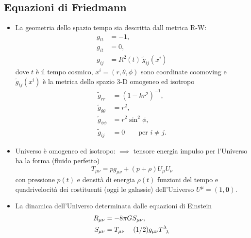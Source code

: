 \chapter{}
\label{cha:cosmologia}

\section{Equazioni di Friedmann}

\begin{itemize}
\item La geometria dello spazio tempo sia descritta dall metrica R-W:
  \begin{subequations}
    \begin{align}
      \label{rw1}
      g_{tt} &= -1, \\
      g_{it} &= 0, \\
      g_{ij} &= R^2(t) ~ \tilde{g}_{ij}(x^i)
    \end{align}
  \end{subequations}
  dove $t$ è il tempo cosmico, $x^{i} = (r,\theta,\phi)$ sono coordinate
  coomoving e $\tilde{g}_{ij}(x^i)$ è la metrica dello spazio 3-D omogeneo ed
  isotropo
  \begin{subequations}
    \begin{align}
      \label{rw2}
      \tilde{g}_{rr} &= (1-kr^2)^{-1}, \\
      \tilde{g}_{\theta \theta} & = r^2, \\
      \tilde{g}_{\phi \phi} &= r^2 \sin^2 \phi, \\
      \tilde{g}_{ij} &= 0 \qquad \text{per $i \ne j$}.
    \end{align}
  \end{subequations}
\item Universo è omogeneo ed isotropo: $\implies$ tensore energia impulso per
  l'Universo ha la forma (fluido perfetto)
  \begin{equation}
    T_{\mu\nu} = p g_{\mu\nu} + (p+\rho) U_{\mu} U_{\nu}
    \label{fp}
  \end{equation}
  con pressione $p(t)$ e densità di energia $\rho(t)$ funzioni del tempo e
  quadrivelocità dei costituenti (oggi le galassie) dell'Universo
  $U^{\mu}=(1,\bm{0})$.
\item La dinamica dell'Universo determinata dalle equazioni di Einstein
  \begin{subequations}
    \begin{align}
      \label{EE}
      R_{\mu\nu} &= -8 \pi G S_{\mu \nu}, \\
      S_{\mu \nu} &= T_{\mu \nu} - (1/2) g_{\mu \nu}
      \tensor{T}{^{\lambda}_{\lambda}}
    \end{align}
  \end{subequations}
\end{itemize}
